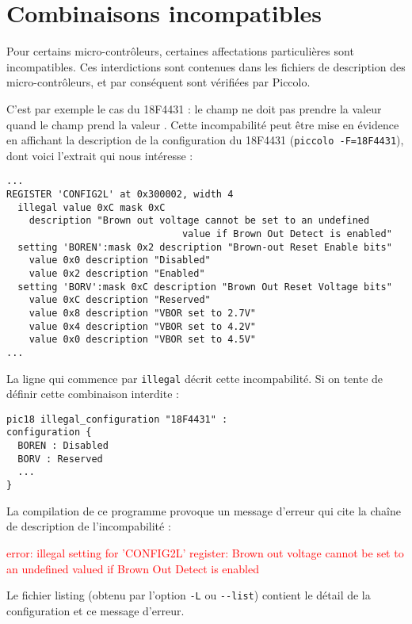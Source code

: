 \section{Combinaisons incompatibles}


Pour certains micro-contrôleurs, certaines affectations particulières sont incompatibles. Ces interdictions sont contenues dans les fichiers de description des micro-contrôleurs, et par conséquent sont vérifiées par Piccolo. 

C’est par exemple le cas du 18F4431 : le champ  ne doit pas prendre la valeur  quand le champ  prend la valeur . Cette incompabilité peut être mise en évidence en affichant la description de la configuration du 18F4431 (\texttt{piccolo -F=18F4431}), dont voici l'extrait qui nous intéresse :

\begin{lstlisting}[frame=l, language=assembleur]
...
REGISTER 'CONFIG2L' at 0x300002, width 4
  illegal value 0xC mask 0xC
    description "Brown out voltage cannot be set to an undefined 
                               value if Brown Out Detect is enabled"
  setting 'BOREN':mask 0x2 description "Brown-out Reset Enable bits"
    value 0x0 description "Disabled"
    value 0x2 description "Enabled"
  setting 'BORV':mask 0xC description "Brown Out Reset Voltage bits"
    value 0xC description "Reserved"
    value 0x8 description "VBOR set to 2.7V"
    value 0x4 description "VBOR set to 4.2V"
    value 0x0 description "VBOR set to 4.5V"
...
\end{lstlisting}


La ligne qui commence par \texttt{illegal} décrit cette incompabilité. Si on tente de définir cette combinaison interdite :
\begin{lstlisting}[language=piccolo]
pic18 illegal_configuration "18F4431" :
configuration {
  BOREN : Disabled
  BORV : Reserved
  ...
}
\end{lstlisting}

La compilation de ce programme provoque un message d’erreur qui cite la chaîne de description de l'incompabilité :


\textcolor{red}{error: illegal setting for 'CONFIG2L' register: Brown out voltage cannot be set to an undefined valued if Brown Out Detect is enabled}

Le fichier listing (obtenu par l’option \texttt{-L} ou \texttt{-{}-list}) contient le détail de la configuration et ce message d’erreur.


